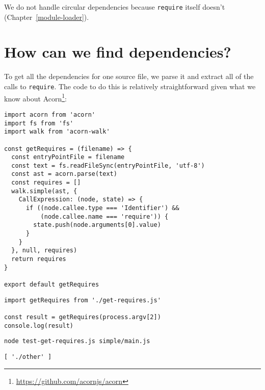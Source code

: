 \documentclass[krantzl]{krantz}
\newcommand{\chapref}[1]{Chapter~\ref{#1}}
\newcommand{\hreffoot}[2]{{#1}\footnote{\href{#2}{#2}}}
\begin{document}
We do not handle circular dependencies
because \texttt{require} itself doesn’t (\chapref{module-loader}).

\section{How can we find dependencies?}\label{module-bundler-find}


To get all the dependencies for one source file,
we parse it and extract all of the calls to \texttt{require}.
The code to do this is relatively straightforward given what we know about \hreffoot{Acorn}{https://github.com/acornjs/acorn}:


\begin{lstlisting}[frame=tblr]
import acorn from 'acorn'
import fs from 'fs'
import walk from 'acorn-walk'

const getRequires = (filename) => {
  const entryPointFile = filename
  const text = fs.readFileSync(entryPointFile, 'utf-8')
  const ast = acorn.parse(text)
  const requires = []
  walk.simple(ast, {
    CallExpression: (node, state) => {
      if ((node.callee.type === 'Identifier') &&
          (node.callee.name === 'require')) {
        state.push(node.arguments[0].value)
      }
    }
  }, null, requires)
  return requires
}

export default getRequires
\end{lstlisting}



\begin{lstlisting}[frame=tblr]
import getRequires from './get-requires.js'

const result = getRequires(process.argv[2])
console.log(result)
\end{lstlisting}



\begin{lstlisting}[frame=shadowbox]
node test-get-requires.js simple/main.js
\end{lstlisting}



\begin{lstlisting}[frame=tblr,backgroundcolor=\color{black!5}]
[ './other' ]
\end{lstlisting}
\end{document}
